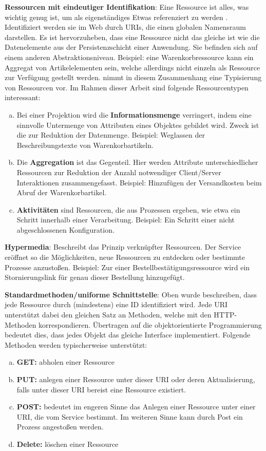 \documentclass[12pt,a4paper,bibliography=totocnumbered,listof=totoc]{scrartcl}
\begin{document}
\begin{compactitem}
\item \textbf{Ressourcen mit eindeutiger Identifikation}: \glqq Eine Ressource ist alles, was wichtig genug ist, um als eigenständiges Etwas referenziert zu werden\grqq{} \citep{richardson07}. Identifiziert werden sie im Web durch URIs, die einen globalen Namensraum darstellen.  Es ist hervorzuheben, dass eine Ressource nicht das gleiche ist wie die Datenelemente aus der Persistenzschicht einer Anwendung. Sie befinden sich auf einem anderen Abstraktionsniveau. Beispiel: eine Warenkorbressource kann ein Aggregat von Artikelelementen sein, welche allerdings nicht einzeln als Ressource zur Verfügung gestellt werden. \citeauthor{tilkov11} nimmt in diesem Zusammenhang eine Typisierung von Ressourcen vor. Im Rahmen dieser Arbeit sind folgende Ressourcentypen interessant:
\begin{enumerate}[a.]
\item Bei einer Projektion wird die \textbf{Informationsmenge} verringert, indem eine sinnvolle Untermenge von Attributen eines Objektes gebildet wird. Zweck ist die zur Reduktion der Datenmenge. Beispiel: Weglassen der Beschreibungstexte von Warenkorbartikeln.
\item Die \textbf{Aggregation} ist das Gegenteil. Hier werden Attribute unterschiedlicher Ressourcen zur Reduktion der Anzahl notwendiger Client/Server Interaktionen zusammengefasst. Beispiel: Hinzufügen der Versandkosten beim Abruf der Warenkorbartikel.
\item \textbf{Aktivitäten} sind Ressourcen, die aus Prozessen ergeben, wie etwa ein Schritt innerhalb einer Verarbeitung. Beispiel: Ein Schritt einer nicht abgeschlossenen Konfiguration.
\end{enumerate}
\item \textbf{Hypermedia}: Beschreibt das Prinzip verknüpfter Ressourcen. Der Service eröffnet so die Möglichkeiten, neue Ressourcen zu entdecken oder bestimmte Prozesse anzustoßen. Beispiel: Zur einer Bestellbestätigungsressource wird ein Stornierungslink für genau dieser Bestellung hinzugefügt.
\item \textbf{Standardmethoden/uniforme Schnittstelle}: Oben wurde beschreiben, dass jede Ressource durch (mindestens) eine ID identifiziert wird. Jede URI unterstützt dabei den gleichen Satz an Methoden, welche mit den HTTP-Methoden korrespondieren. Übertragen auf die objektorientierte Programmierung bedeutet dies, dass jedes Objekt das gleiche Interface implementiert. Folgende Methoden werden typischerweise unterstützt:
\begin{enumerate}[a.]
\item \textbf{GET:} abholen einer Ressource
\item \textbf{PUT:} anlegen einer Ressource unter dieser URI oder deren Aktualisierung, falls unter dieser URI bereist eine Ressource existiert.
\item \textbf{POST:} bedeutet im engeren Sinne das Anlegen einer Ressource unter einer URI, die vom Service bestimmt. Im weiteren Sinne kann durch Post ein Prozess angestoßen werden.
\item \textbf{Delete:} löschen einer Ressource
\end{enumerate}


\end{compactitem}
\end{document}
